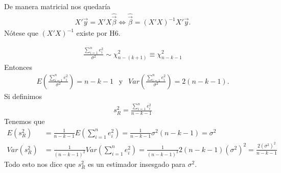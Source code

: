 De manera matricial nos quedaría
\begin{align*}
    X'\vec{y} = X'X\widehat{\vec{\beta}} \Longleftrightarrow \widehat{\vec{\beta}} = (X'X)^{-1}X'\vec{y}.
\end{align*}
Nótese que $(X'X)^{-1}$ existe por H6.

\begin{obs}
    \begin{align*}
        \frac{\sum_{i=1}^{n} e_i^2}{\sigma^2} \sim \chi^2_{n-(k+1)} \equiv \chi^2_{n-k-1}
    \end{align*}
    Entonces
        \begin{align*}
        E\left( \frac{\sum_{i=1}^{n} e_i^2}{\sigma^2}  \right) = n-k-1 \ \ \text{ y } \ \ Var\left( \frac{\sum_{i=1}^{n} e_i^2}{\sigma^2} \right) = 2(n-k-1).
    \end{align*}
    Si definimos 
    \begin{align*}
    \boxed{
        s_R^2 = \frac{\sum_{i=1}^{n} e_i^2}{n-k-1}
        }
    \end{align*}
    Tenemos que
    \begin{align*}
        E(s_R^2) &= \frac{1}{n-k-1}E\left( \sum_{i=1}^{n} e_i^2 \right) = \frac{1}{n-k-1} \sigma^2(n-k-1) = \sigma^2 \\
        Var(s_R^2) &= \frac{1}{(n-k-1)^2}Var\left( \sum_{i=1}^{n} e_i^2 \right) = \frac{1}{(n-k-1)^2} 2(n-k-1) (\sigma^2)^2 = \frac{2(\sigma^2)^2}{n-k-1}
    \end{align*}
    Todo esto nos dice que $s_R^2$ es un estimador insesgado para $\sigma^2$.
\end{obs}

